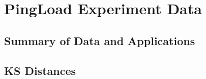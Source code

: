 \section{PingLoad Experiment Data}

\subsection{Summary of Data and Applications}


\subsection{KS Distances}
